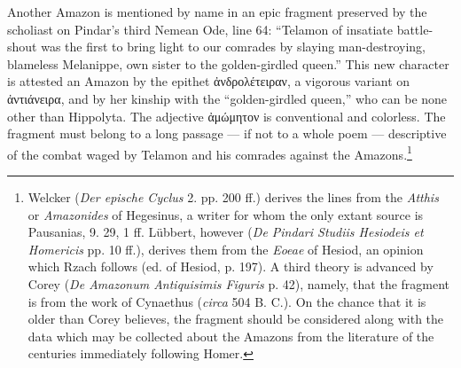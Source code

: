 \documentclass[a4paper, 12pt, oneside]{article}
\begin{document}
Another Amazon is mentioned by name in an epic fragment preserved by the scholiast on Pindar's third Nemean Ode, line 64: ``Telamon of insatiate battle-shout was the first to bring light to our comrades by slaying man-destroying, blameless Melanippe, own sister to the golden-girdled queen.'' This new character is attested an Amazon by the epithet ἀνδρολέτειραν, a vigorous variant on ἀντιάνειρα, and by her kinship with the ``golden-girdled queen,'' who can be none other than Hippolyta. The adjective ἀμώμητον is conventional and colorless. The fragment must belong to a long passage --- if not to a whole poem --- descriptive of the combat waged by Telamon and his comrades against the Amazons.\footnote{Welcker (\emph{Der epische Cyclus} 2. pp. 200 ff.) derives the lines from the \emph{Atthis} or \emph{Amazonides} of Hegesinus, a writer for whom the only extant source is Pausanias, 9. 29, 1 ff. Lübbert, however (\emph{De Pindari Studiis Hesiodeis et Homericis} pp. 10 ff.), derives them from the \emph{Eoeae} of Hesiod, an opinion which Rzach follows (ed. of Hesiod, p. 197). A third theory is advanced by Corey (\emph{De Amazonum Antiquisimis Figuris} p. 42), namely, that the fragment is from the work of Cynaethus (\emph{circa} 504 B. C.). On the chance that it is older than Corey believes, the fragment should be considered along with the data which may be collected about the Amazons from the literature of the centuries immediately following Homer.}
\end{document}
